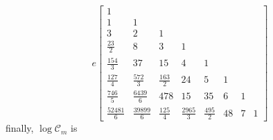 \begin{displaymath}
e \left[\begin{matrix}1 &   &   &   &   &   &   &  \\1 & 1 &   &   &   &   &   &  \\3 & 2 & 1 &   &   &   &   &  \\\frac{23}{2} & 8 & 3 & 1 &   &   &   &  \\\frac{154}{3} & 37 & 15 & 4 & 1 &   &   &  \\\frac{1 27}{4} & \frac{572}{3} & \frac{163}{2} & 24 & 5 & 1 &   &  \\\frac{7 46}{5} & \frac{6439}{6} & 478 & 15  & 35 & 6 & 1 &  \\\frac{5 2481}{6 } & \frac{39 899}{6 } & \frac{12  5}{4} & \frac{2965}{3} & \frac{495}{2} & 48 & 7 & 1\end{matrix}\right]
\end{displaymath}
finally, $\log{\mathcal{C}_{m}}$ is
